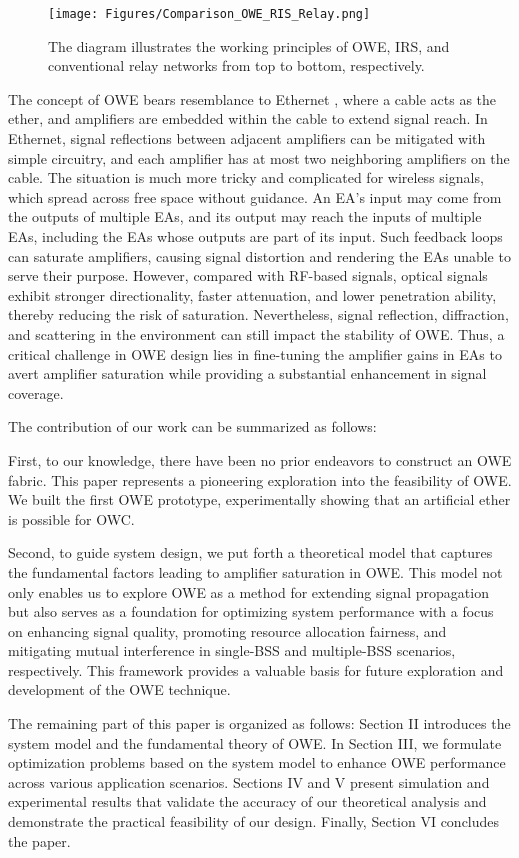 \begin{figure}
\centering
\texttt{[image: Figures/Comparison\_OWE\_RIS\_Relay.png]}
\caption{The diagram illustrates the working principles of OWE, IRS, and conventional relay networks from top to bottom, respectively.}
\label{OWE_RIS_Relay}
\vspace{-0.5cm}
\end{figure}
\par

The concept of OWE bears resemblance to Ethernet \cite{held2002ethernet, 9844436}, where a cable acts as the ether, and amplifiers are embedded within the cable to extend signal reach. In Ethernet, signal reflections between adjacent amplifiers can be mitigated with simple circuitry, and each amplifier has at most two neighboring amplifiers on the cable.
The situation is much more tricky and complicated for wireless signals, which spread across free space without guidance. 
An EA's input may come from the outputs of multiple EAs, and its output may reach the inputs of multiple EAs, including the EAs whose outputs are part of its input. Such feedback loops can saturate amplifiers, causing signal distortion and rendering the EAs unable to serve their purpose.
However, compared with RF-based signals, optical signals exhibit stronger directionality, faster attenuation, and lower penetration ability, thereby reducing the risk of saturation. Nevertheless, signal reflection, diffraction, and scattering in the environment can still impact the stability of OWE. Thus, a critical challenge in OWE design lies in fine-tuning the amplifier gains in EAs to avert amplifier saturation while providing a substantial enhancement in signal coverage.
\par
The contribution of our work can be summarized as follows:
\par
First, to our knowledge, there have been no prior endeavors to construct an OWE fabric. This paper represents a pioneering exploration into the feasibility of OWE. We built the first OWE prototype, experimentally showing that an artificial ether is possible for OWC.
\par
Second, to guide system design, we put forth a theoretical model that captures the fundamental factors leading to amplifier saturation in OWE. This model not only enables us to explore OWE as a method for extending signal propagation but also serves as a foundation for optimizing system performance with a focus on enhancing signal quality, promoting resource allocation fairness, and mitigating mutual interference in single-BSS and multiple-BSS scenarios, respectively. This framework provides a valuable basis for future exploration and development of the OWE technique.
\par
The remaining part of this paper is organized as follows: Section II introduces the system model and the fundamental theory of OWE. In Section III, we formulate optimization problems based on the system model to enhance OWE performance across various application scenarios. Sections IV and V present simulation and experimental results that validate the accuracy of our theoretical analysis and demonstrate the practical feasibility of our design. Finally, Section VI concludes the paper.